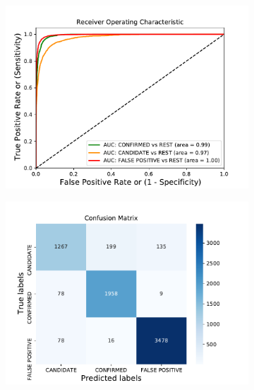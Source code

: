 \begin{figure}[H]
                \centering
                \begin{subfigure}{.49\textwidth}
                \includegraphics[width = 1\textwidth]{data/XGB_vif_cap1_overfit_roc.pdf}
                \end{subfigure}
                \begin{subfigure}{.49\textwidth}
                \includegraphics[width = 1\textwidth]{data/XGB_vif_cap1_overfit_cm.pdf}
                \end{subfigure}
                \begin{subfigure}{.49\textwidth}

\end{subfigure}
\end{figure}
